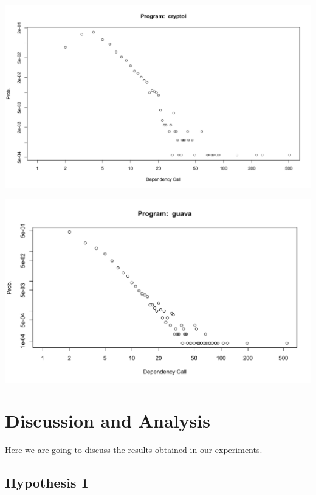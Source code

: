 \documentclass[12pt, a4paper]{article}
\begin{document}
\begin{minipage}[t]{\linewidth}
    \includegraphics[width=\textwidth]{power_law_fp.png}
    \captionsetup{type=figure}
    \label{fig:power_law_fp}
  \end{minipage}

  \begin{minipage}[t]{\linewidth}
    \includegraphics[width=\textwidth]{power_law_oop.png}
    \captionsetup{type=figure}
    \label{fig:power_law_oop}
  \end{minipage}


\section{Discussion and Analysis}

Here we are going to discuss the results obtained in our experiments.

\subsection{Hypothesis 1}
\end{document}

